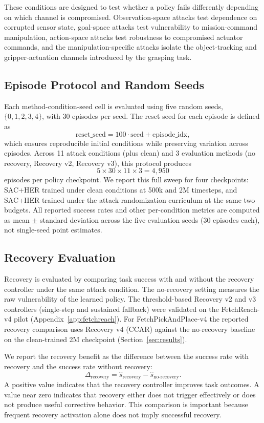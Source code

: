 \documentclass[conference]{IEEEtran}
\begin{document}
These conditions are designed to test whether a policy fails differently depending on
which channel is compromised. Observation-space attacks test dependence on corrupted
sensor state, goal-space attacks test vulnerability to mission-command manipulation,
action-space attacks test robustness to compromised actuator commands, and the
manipulation-specific attacks isolate the object-tracking and gripper-actuation
channels introduced by the grasping task.

\subsection{Episode Protocol and Random Seeds}

Each method-condition-seed cell is evaluated using five random seeds,
$\{0,1,2,3,4\}$, with 30 episodes per seed. The reset seed for each episode is defined
as
\[
\text{reset\_seed} = 100 \cdot \text{seed} + \text{episode\_idx},
\]
which ensures reproducible initial conditions while preserving variation across
episodes. Across 11 attack conditions (plus clean) and 3 evaluation methods
(no recovery, Recovery v2, Recovery v3), this protocol produces
\[
5 \times 30 \times 11 \times 3 = 4{,}950
\]
episodes per policy checkpoint. We report this full sweep for four checkpoints:
SAC+HER trained under clean conditions at 500k and 2M timesteps, and SAC+HER trained
under the attack-randomization curriculum at the same two budgets. All reported
success rates and other per-condition metrics are computed as mean $\pm$ standard
deviation across the five evaluation seeds (30 episodes each), not single-seed point
estimates.

\subsection{Recovery Evaluation}

Recovery is evaluated by comparing task success with and without the recovery
controller under the same attack condition. The no-recovery setting measures the raw
vulnerability of the learned policy. The threshold-based Recovery v2 and v3 controllers
(single-step and sustained fallback) were validated on the FetchReach-v4 pilot
(Appendix~\ref{app:fetchreach}). For FetchPickAndPlace-v4 the reported recovery
comparison uses Recovery v4 (CCAR) against the no-recovery baseline on the clean-trained
2M checkpoint (Section~\ref{sec:results}).

We report the recovery benefit as the difference between the success rate with recovery
and the success rate without recovery:
\[
\Delta_{\mathrm{recovery}} =
\hat{s}_{\mathrm{recovery}} -
\hat{s}_{\mathrm{no\mbox{-}recovery}}.
\]
A positive value indicates that the recovery controller improves task outcomes. A value
near zero indicates that recovery either does not trigger effectively or does not
produce useful corrective behavior. This comparison is important because frequent
recovery activation alone does not imply successful recovery.
\end{document}
